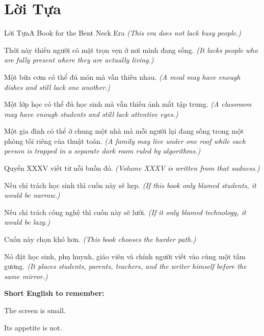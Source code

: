 \chapter*{Lời Tựa}

\begin{truyen}{Lời Tựa}{A Book for the Bent Neck Era}
\textit{(This era does not lack busy people.)}

Thời này thiếu người có mặt trọn vẹn ở nơi mình đang sống.
\textit{(It lacks people who are fully present where they are actually living.)}

Một bữa cơm có thể đủ món mà vẫn thiếu nhau.
\textit{(A meal may have enough dishes and still lack one another.)}

Một lớp học có thể đủ học sinh mà vẫn thiếu ánh mắt tập trung.
\textit{(A classroom may have enough students and still lack attentive eyes.)}

Một gia đình có thể ở chung một nhà mà mỗi người lại đang sống trong một phòng tối riêng của thuật toán.
\textit{(A family may live under one roof while each person is trapped in a separate dark room ruled by algorithms.)}

Quyển XXXV viết từ nỗi buồn đó.
\textit{(Volume XXXV is written from that sadness.)}
\end{truyen}

\begin{baihoc}
Nếu chỉ trách học sinh thì cuốn này sẽ hẹp.
\textit{(If this book only blamed students, it would be narrow.)}

Nếu chỉ trách công nghệ thì cuốn này sẽ lười.
\textit{(If it only blamed technology, it would be lazy.)}

Cuốn này chọn khó hơn.
\textit{(This book chooses the harder path.)}

Nó đặt học sinh, phụ huynh, giáo viên và chính người viết vào cùng một tấm gương.
\textit{(It places students, parents, teachers, and the writer himself before the same mirror.)}
\end{baihoc}

\begin{ghinhoanh}
\textbf{Short English to remember:}

The screen is small.

Its appetite is not.
\end{ghinhoanh}

\ngancach